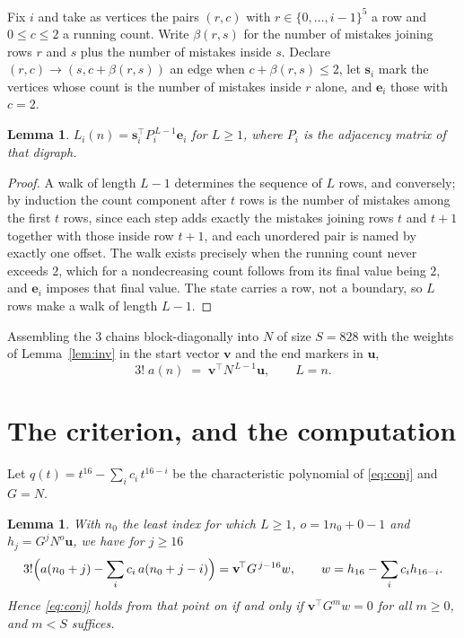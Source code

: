 \documentclass[11pt,a4paper]{article}
\theoremstyle{plain}
\newtheorem{lemma}[theorem]{Lemma}
\theoremstyle{definition}
\begin{document}
Fix $i$ and take as vertices the pairs $(r,c)$ with $r\in\{0,\dots,i-1\}^{5}$ a row
and $0\le c\le2$ a running count. Write $\beta(r,s)$ for the number of mistakes joining
rows $r$ and $s$ plus the number of mistakes inside $s$. Declare $(r,c)\to(s,c+\beta(r,s))$
an edge when $c+\beta(r,s)\le2$, let $\mathbf{s}_i$ mark the vertices whose count is the
number of mistakes inside $r$ alone, and $\mathbf{e}_i$ those with $c=2$.

\begin{lemma}\label{lem:walk}
$L_i(n)=\mathbf{s}_i^{\!\top}P_i^{\,L-1}\mathbf{e}_i$ for $L\ge1$, where $P_i$ is the
adjacency matrix of that digraph.
\end{lemma}

\begin{proof}
A walk of length $L-1$ determines the sequence of $L$ rows, and conversely; by induction
the count component after $t$ rows is the number of mistakes among the first $t$ rows,
since each step adds exactly the mistakes joining rows $t$ and $t+1$ together with those
inside row $t+1$, and each unordered pair is named by exactly one offset. The walk exists
precisely when the running count never exceeds $2$, which for a nondecreasing count follows
from its final value being $2$, and $\mathbf{e}_i$ imposes that final value. The state
carries a row, not a boundary, so $L$ rows make a walk of length $L-1$.
\end{proof}

Assembling the $3$ chains block-diagonally into $N$ of size $S=828$ with the weights of
Lemma~\ref{lem:inv} in the start vector $\mathbf{v}$ and the end markers in
$\mathbf{u}$,
\begin{equation}\label{eq:walk2}
3!\;a(n)\;=\;\mathbf{v}^{\!\top}N^{\,L-1}\mathbf{u},\qquad L=n .
\end{equation}

\section{The criterion, and the computation}

Let $q(t)=t^{16}-\sum_i c_i\,t^{16-i}$ be the characteristic polynomial of
\eqref{eq:conj} and $G=N$.

\begin{lemma}\label{lem:crit}
With $n_0$ the least index for which $L\ge1$, $o=1n_0+0-1$ and
$h_j=G^{j}N^{o}\mathbf{u}$, we have for $j\ge16$
\[
3!\Bigl(a(n_0+j)-\sum_i c_i\,a(n_0+j-i)\Bigr)=\mathbf{v}^{\!\top}G^{\,j-16}w,
\qquad w=h_{16}-\sum_i c_ih_{16-i} .
\]
Hence \eqref{eq:conj} holds from that point on if and only if
$\mathbf{v}^{\!\top}G^{m}w=0$ for all $m\ge0$, and $m<S$ suffices.
\end{lemma}
\end{document}
